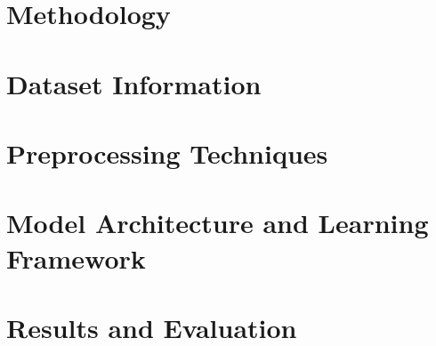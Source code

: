 
\section{Methodology}



\section{Dataset Information}



\section{Preprocessing Techniques}



\section{Model Architecture and Learning Framework}



\section{Results and Evaluation}


